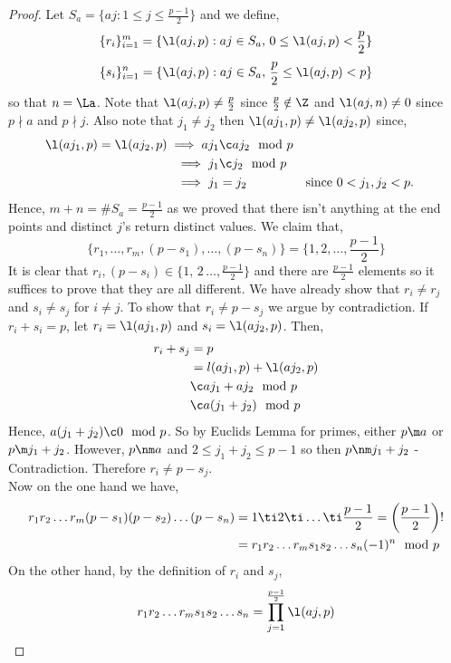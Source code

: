 \begin{proof}
  Let $S_a = \{aj : 1 \le j \le \frac{p-1}{2}\}$ and we define,
  $$ \{r_i\}_{i=1}^m = \{\l(aj, p) : aj \in S_a,\, 0 \le \l(aj, p) < \frac{p}{2}\} $$
  $$ \{s_i\}_{i=1}^n = \{\l(aj, p) : aj \in S_a,\, \frac{p}{2} \le \l(aj, p) < {p}\} $$
  so that $n = \La$. Note that $\l(aj, p) \ne \frac{p}{2}$ since $\frac{p}{2} \notin \Z$ and $\l(aj, n) \ne 0$ since $p \nmid a$ and $p \nmid j$. Also note that $j_1 \ne j_2$ then $\l(aj_1, p) \ne \l(aj_2, p)$ since,
  \begin{align*}
    \l(aj_1, p) = \l(aj_2, p) \implies aj_1 &\c aj_2 \mod p \\
    \implies j_1 &\c j_2 \mod p\\
    \implies j_1 &= j_2 && \text{since $0 < j_1, j_2 < p$.}
  \end{align*}
  Hence, $m + n = \#S_a = \frac{p-1}{2}$ as we proved that there isn't anything at the end points and distinct $j$'s return distinct values. We claim that,
  $$ \{r_1, \dots, r_m, (p - s_1), \dots, (p - s_n)\} = \{1, 2, \dots, \frac{p-1}{2}\} $$
  It is clear that $r_i, (p - s_i) \in \{1,\,2\,\dots, \frac{p-1}{2}\}$ and there are $\frac{p-1}{2}$ elements so it suffices to prove that they are all different. We have already show that $r_i \ne r_j$ and $s_i \ne s_j$ for $i \ne j$. To show that $r_i \ne p - s_j$ we argue by contradiction. If $r_i + s_i = p$, let $r_i = \l(aj_1, p)$ and $s_i = \l(aj_2, p)$. Then,
  \begin{align*}
    r_i + s_j &= p \\
    &= l(aj_1, p) + \l(aj_2, p) \\
    &\c aj_1 + aj_2 \mod p\\
    &\c a(j_1 + j_2) \mod p
  \end{align*}
  Hence, $a(j_1 + j_2) \c 0 \mod p$. So by Euclids Lemma for primes, either $p \m a$ or $p \m j_1 + j_2$. However, $p \nm a$ and $2 \le j_1 + j_2 \le p -1$ so then $p \nm j_1 + j_2$ - Contradiction. Therefore $r_i \ne p - s_j$. \\
  Now on the one hand we have,
  \begin{align*}
    r_1r_2 \dots r_m(p-s_1)(p-s_2) \dots (p - s_n) &= 1 \ti 2 \ti \dots \ti \frac{p-1}{2} = \left(\frac{p-1}{2}\right)!\\
    &= r_1r_2\dots r_m s_1s_2 \dots s_n (-1)^n \mod p
  \end{align*}
  On the other hand, by the definition of $r_i$ and $s_j$,
  \begin{align*}
    r_1r_2 \dots r_ms_1s_2\dots s_n &= \prod_{j=1}^{\frac{p-1}{2}} \l(aj, p) \\

\end{align*}
\end{proof}
